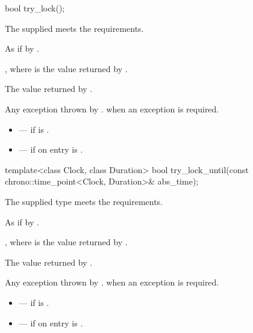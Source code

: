 %
\begin{itemdecl}
bool try_lock();
\end{itemdecl}

\begin{itemdescr}
\pnum
\expects
The supplied  meets the 
requirements.

\pnum
\effects
As if by .

\pnum
\ensures
{}, where  is the value returned by
.

\pnum
\returns
The value returned by .

\pnum
\throws
Any exception thrown by .  when an exception
is required.

\pnum
\errors
\begin{itemize}
\item {} --- if  is .
\item {} --- if on entry 
is .
\end{itemize}
\end{itemdescr}

%
\begin{itemdecl}
template<class Clock, class Duration>
  bool try_lock_until(const chrono::time_point<Clock, Duration>& abs_time);
\end{itemdecl}

\begin{itemdescr}
\pnum
\expects
The supplied  type meets the 
requirements.

\pnum
\effects
As if by .

\pnum
\ensures
{}, where  is the value returned by
.

\pnum
\returns
The value returned by .

\pnum
\throws
Any exception thrown by .  when an
exception is required.

\pnum
\errors
\begin{itemize}
\item {} --- if  is .
\item {} --- if on entry  is
.
\end{itemize}
\end{itemdescr}

